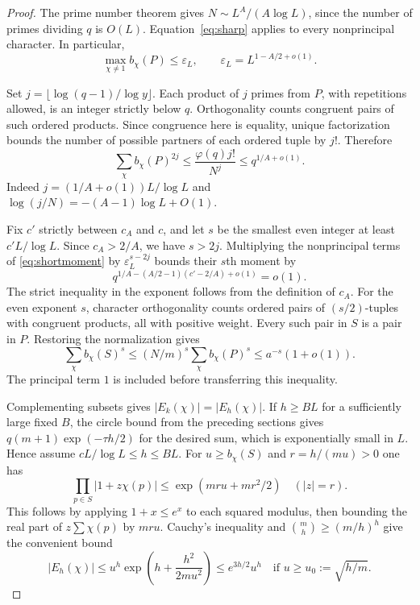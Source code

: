 \documentclass[11pt]{article}
\renewcommand{\epsilon}{\varepsilon}
\begin{document}
\begin{proof}
The prime number theorem gives $N\sim L^A/(A\log L)$, since the number
of primes dividing $q$ is $O(L)$. Equation~\eqref{eq:sharp} applies to every nonprincipal character. In particular,
\[
 \max_{\chi\ne1}b_\chi(P)\le \epsilon_L,
 \qquad \epsilon_L=L^{1-A/2+o(1)}.
\]

Set $j=\lfloor\log(q-1)/\log y\rfloor$. Each product of $j$ primes
from $P$, with repetitions allowed, is an integer strictly below $q$.
Orthogonality counts congruent pairs of such ordered products. Since
congruence here is equality, unique factorization bounds the number of
possible partners of each ordered tuple by $j!$. Therefore
\begin{equation}\label{eq:shortmoment}
 \sum_\chi b_\chi(P)^{2j}
 \le\frac{\varphi(q)j!}{N^j}
 \le q^{1/A+o(1)}.
\end{equation}
Indeed $j=(1/A+o(1))L/\log L$ and
$\log(j/N)=-(A-1)\log L+O(1)$.

Fix $c'$ strictly between $c_A$ and $c$, and let $s$ be the smallest even
integer at least $c'L/\log L$. Since $c_A>2/A$, we have $s>2j$.
Multiplying the nonprincipal terms of \eqref{eq:shortmoment} by
$\epsilon_L^{s-2j}$ bounds their $s$th moment by
\[
 q^{1/A-(A/2-1)(c'-2/A)+o(1)}=o(1).
\]
The strict inequality in the exponent follows from the definition of $c_A$.
For the even exponent $s$, character orthogonality counts ordered pairs of
$(s/2)$-tuples with congruent products, all with positive weight.
Every such pair in $S$ is a pair in $P$. Restoring the normalization gives
\begin{equation}\label{eq:momenttransfer}
 \sum_\chi b_\chi(S)^s
 \le (N/m)^s \sum_\chi b_\chi(P)^s
 \le a^{-s}(1+o(1)).
\end{equation}
The principal term $1$ is included before transferring this inequality.

Complementing subsets gives $|E_k(\chi)|=|E_h(\chi)|$.
If $h\ge BL$ for a sufficiently large fixed $B$, the circle bound from
the preceding sections gives
$q(m+1)\exp(-\tau h/2)$ for the desired sum, which is exponentially
small in $L$. Hence assume $cL/\log L\le h\le BL$.
For $u\ge b_\chi(S)$ and $r=h/(mu)>0$ one has
\[
 \prod_{p\in S}|1+z\chi(p)|
 \le\exp(mru+mr^2/2)\quad (|z|=r).
\]
This follows by applying $1+x\le e^x$ to each squared modulus,
then bounding the real part of $z\sum\chi(p)$ by $mru$.
Cauchy's inequality and $\binom mh\ge(m/h)^h$ give the convenient bound
\begin{equation}\label{eq:smallcoeff}
 |E_h(\chi)|\le u^h\exp\!\left(h+\frac{h^2}{2mu^2}\right)
 \le e^{3h/2}u^h
 \quad\text{if } u\ge u_0:=\sqrt{h/m}.
\end{equation}


\end{proof}
\end{document}
